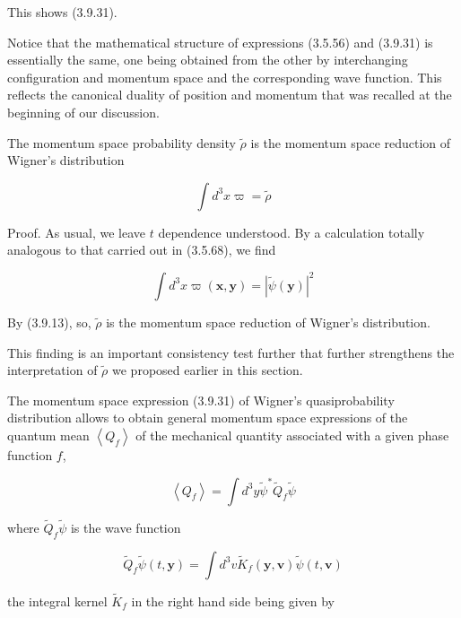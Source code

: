 \documentclass{article}
\begin{document}
This shows (3.9.31).

Notice that the mathematical structure of expressions (3.5.56) and (3.9.31) is essentially the same, one being obtained from the other by interchanging configuration and momentum space and the corresponding wave function. This reflects the canonical duality of position and momentum that was recalled at the beginning of our discussion.

The momentum space probability density $\tilde{\rho}$ is the momentum space reduction of Wigner's distribution
 
\begin{equation*}
\int d^{3} x \varpi=\tilde{\rho} \tag{3.9.34}
\end{equation*}
 

Proof. As usual, we leave $t$ dependence understood. By a calculation totally analogous to that carried out in (3.5.68), we find
 
\begin{equation*}
\int d^{3} x \varpi(\boldsymbol{x}, \boldsymbol{y})=|\tilde{\psi}(\boldsymbol{y})|^{2} \tag{3.9.35}
\end{equation*}
 

By (3.9.13), so, $\tilde{\rho}$ is the momentum space reduction of Wigner's distribution.

This finding is an important consistency test further that further strengthens the interpretation of $\tilde{\rho}$ we proposed earlier in this section.

The momentum space expression (3.9.31) of Wigner's quasiprobability distribution allows to obtain general momentum space expressions of the quantum mean $\left\langle Q_{f}\right\rangle$ of the mechanical quantity associated with a given phase function $f$,
 
\begin{equation*}
\left\langle Q_{f}\right\rangle=\int d^{3} y \tilde{\psi}^{*} \tilde{Q}_{f} \tilde{\psi} \tag{3.9.36}
\end{equation*}
 
where $\tilde{Q}_{f} \tilde{\psi}$ is the wave function
 
\begin{equation*}
\tilde{Q}_{f} \tilde{\psi}(t, \boldsymbol{y})=\int d^{3} v \tilde{K}_{f}(\boldsymbol{y}, \boldsymbol{v}) \tilde{\psi}(t, \boldsymbol{v}) \tag{3.9.37}
\end{equation*}
 
the integral kernel $\tilde{K}_{f}$ in the right hand side being given by
 
\end{document}
